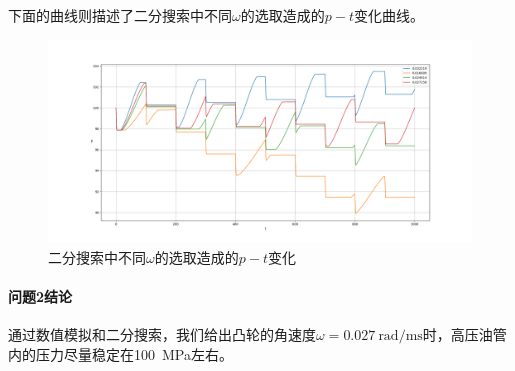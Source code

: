 \documentclass[12pt,AutoFakeBold]{article}%
\begin{document}
    下面的曲线则描述了二分搜索中不同$\omega$的选取造成的$p-t$变化曲线。
    \begin{figure}[H]
        \centering
        \includegraphics[scale=0.32]{figure/3-2.png}
        \caption{二分搜索中不同$\omega$的选取造成的$p-t$变化}
    \end{figure}
    \paragraph{问题2结论}
    通过数值模拟和二分搜索，我们给出凸轮的角速度$\omega=\SI{0.027}{\radian\per\ms}$时，高压油管内的压力尽量稳定在\SI{100}{\MPa}左右。
\end{document}
